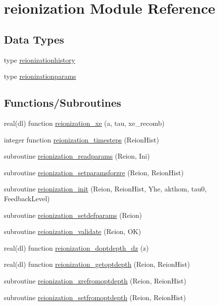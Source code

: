 \hypertarget{namespacereionization}{}\section{reionization Module Reference}
\label{namespacereionization}
\subsection*{Data Types}
\begin{DoxyCompactItemize}
\item 
type \mbox{\hyperlink{structreionization_1_1reionizationhistory}{reionizationhistory}}
\item 
type \mbox{\hyperlink{structreionization_1_1reionizationparams}{reionizationparams}}
\end{DoxyCompactItemize}
\subsection*{Functions/\+Subroutines}
\begin{DoxyCompactItemize}
\item 
real(dl) function \mbox{\hyperlink{namespacereionization_a2ed4204b4a8a9400f3e0b3a8f628b584}{reionization\+\_\+xe}} (a, tau, xe\+\_\+recomb)
\item 
integer function \mbox{\hyperlink{namespacereionization_adedd398d9dbfdc65012047bdfe5b9043}{reionization\+\_\+timesteps}} (Reion\+Hist)
\item 
subroutine \mbox{\hyperlink{namespacereionization_a8d8a4a4fcaa0e1adc50de9a45143d2f8}{reionization\+\_\+readparams}} (Reion, Ini)
\item 
subroutine \mbox{\hyperlink{namespacereionization_aee52456a0e9c89ddc33d45ae3d14a484}{reionization\+\_\+setparamsforzre}} (Reion, Reion\+Hist)
\item 
subroutine \mbox{\hyperlink{namespacereionization_a59dc84ce6904020903bfc0ae6f864a27}{reionization\+\_\+init}} (Reion, Reion\+Hist, Yhe, akthom, tau0, Feedback\+Level)
\item 
subroutine \mbox{\hyperlink{namespacereionization_acd4c0417f4ec9bc6d5c9b6bea2b7b035}{reionization\+\_\+setdefparams}} (Reion)
\item 
subroutine \mbox{\hyperlink{namespacereionization_a3b0809c8b733201a4293d2bd47d81398}{reionization\+\_\+validate}} (Reion, OK)
\item 
real(dl) function \mbox{\hyperlink{namespacereionization_a9b89486311458d0dbd526fc233ca5ba5}{reionization\+\_\+doptdepth\+\_\+dz}} (z)
\item 
real(dl) function \mbox{\hyperlink{namespacereionization_a8a3b0a917762ce13033f59ef52fad521}{reionization\+\_\+getoptdepth}} (Reion, Reion\+Hist)
\item 
subroutine \mbox{\hyperlink{namespacereionization_a00f14156cc08a86c4b28e0d21bc7cd2e}{reionization\+\_\+zrefromoptdepth}} (Reion, Reion\+Hist)
\item 
subroutine \mbox{\hyperlink{namespacereionization_a13fb01c3cb03034262b0447b7527aae9}{reionization\+\_\+setfromoptdepth}} (Reion, Reion\+Hist)
\end{DoxyCompactItemize}
